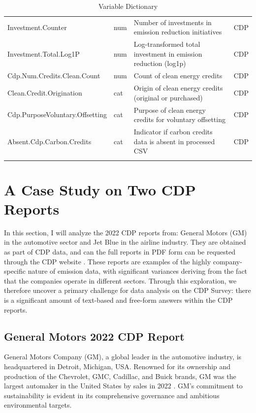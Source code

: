 \begin{longtable}{lp{1cm}p{6cm}p{1.1cm}}
    Investment.Counter & num & Number of investments in emission reduction initiatives & CDP \\
    Investment.Total.Log1P & num & Log-transformed total investment in emission reduction (log1p) & CDP \\
    Cdp.Num.Credits.Clean.Count & num & Count of clean energy credits & CDP \\
    Clean.Credit.Origination & cat & Origin of clean energy credits (original or purchased) & CDP \\
    Cdp.PurposeVoluntary.Offsetting & cat & Purpose of clean energy credits for voluntary offsetting & CDP \\
    Absent.Cdp.Carbon.Credits & cat & Indicator if carbon credits data is absent in processed CSV & CDP \\
    \bottomrule
\caption{Variable Dictionary}
\label{tab:variable-dictionary}
\end{longtable}

\section{A Case Study on Two CDP Reports}

In this section, I will analyze the  2022 CDP reports from: General Motors (GM) in the automotive sector and Jet Blue in the airline industry. They are obtained as part of CDP data, and can the full reports in PDF form can be requested through the CDP website \cite{Cdp2017}. These reports are examples of the highly company-specific nature of emission data, with significant variances deriving from the fact that the companies operate in different sectors. Through this exploration, we therefore uncover a primary challenge for data analysis on the CDP Survey: there is a significant amount of text-based and free-form answers within the CDP reports.

\subsection{General Motors 2022 CDP Report}
General Motors Company (GM), a global leader in the automotive industry, is headquartered in Detroit, Michigan, USA. Renowned for its ownership and production of the Chevrolet, GMC, Cadillac, and Buick brands, GM was the largest automaker in the United States by sales in 2022 \cite{GeneralMotorsWikipedia}. GM's commitment to sustainability is evident in its comprehensive governance and ambitious environmental targets.

